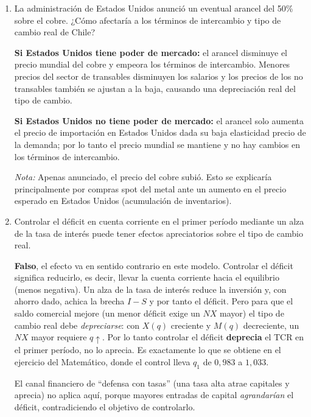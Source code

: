 \documentclass[a4paper]{article}
\begin{document}
\begin{enumerate}
    \item[d)] La administración de Estados Unidos anunció un eventual arancel del 50\% sobre el cobre. ¿Cómo afectaría a los términos de intercambio y tipo de cambio real de Chile?

    \begin{solution}
        \textbf{Si Estados Unidos tiene poder de mercado:} el arancel disminuye el precio mundial del cobre y empeora los términos de intercambio. Menores precios del sector de transables disminuyen los salarios y los precios de los no transables también se ajustan a la baja, causando una depreciación real del tipo de cambio.

        \textbf{Si Estados Unidos no tiene poder de mercado:} el arancel solo aumenta el precio de importación en Estados Unidos dada su baja elasticidad precio de la demanda; por lo tanto el precio mundial se mantiene y no hay cambios en los términos de intercambio.
        \vspace{3mm}

        \textit{Nota:} Apenas anunciado, el precio del cobre subió. Esto se explicaría principalmente por compras spot del metal ante un aumento en el precio esperado en Estados Unidos (acumulación de inventarios).
    \end{solution}

    \item[e)] Controlar el déficit en cuenta corriente en el primer período mediante un alza de la tasa de interés puede tener efectos apreciatorios sobre el tipo de cambio real.

    \begin{solution}
        \textbf{Falso}, el efecto va en sentido contrario en este modelo. Controlar el déficit significa reducirlo, es decir, llevar la cuenta corriente hacia el equilibrio (menos negativa). Un alza de la tasa de interés reduce la inversión y, con ahorro dado, achica la brecha $I-S$ y por tanto el déficit. Pero para que el saldo comercial mejore (un menor déficit exige un $NX$ mayor) el tipo de cambio real debe \emph{depreciarse}: con $X(q)$ creciente y $M(q)$ decreciente, un $NX$ mayor requiere $q\uparrow$. Por lo tanto controlar el déficit \textbf{deprecia} el TCR en el primer período, no lo aprecia. Es exactamente lo que se obtiene en el ejercicio del Matemático, donde el control lleva $q_1$ de $0{,}983$ a $1{,}033$.

        El canal financiero de ``defensa con tasas'' (una tasa alta atrae capitales y aprecia) no aplica aquí, porque mayores entradas de capital \emph{agrandarían} el déficit, contradiciendo el objetivo de controlarlo.
    \end{solution}


\end{enumerate}
\end{document}
